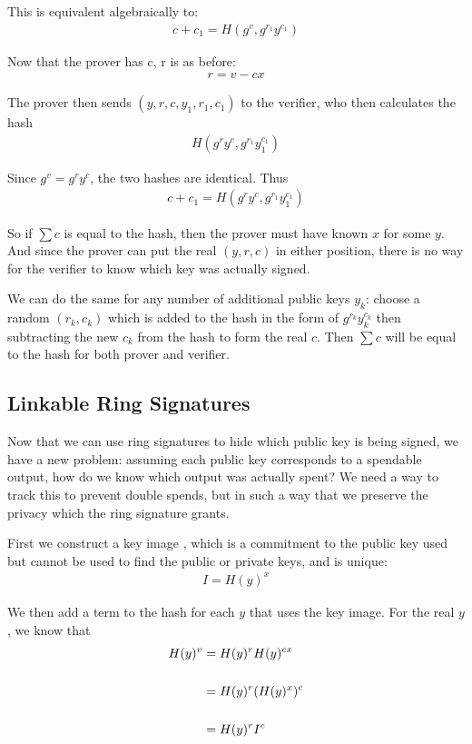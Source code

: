 \documentclass{article}
\begin{document}
This is equivalent algebraically to:
\begin{align}
  c + c_1 = H(g^v, g^{r_1} y^{c_1})\nonumber
\end{align}

Now that the prover has c, r is as before:
\begin{align}
  r = v - cx
\end{align}

The prover then sends $(y, r, c, y_1, r_1, c_1)$ to the verifier, who then calculates the hash
\begin{align}
  H(g^r y^c, g^{r_1} y_1^{c_1})\nonumber
\end{align}

Since $g^v = g^r y^c$, the two hashes are identical.  Thus 
\begin{align}
  c + c_1 = H(g^r y^c, g^{r_1} y_1^{c_1})
\end{align}

So if $\sum c$ is equal to the hash, then the prover must have known $x$ for some $y$.  And since the prover can put the real $(y,r,c)$ in either position, there is no way for the verifier to know which key was actually signed.

We can do the same for any number of additional public keys $y_k$: choose a random $(r_k,c_k)$ which is added to the hash in the form of $g^{r_k}y_k^{c_k}$ then subtracting the new $c_k$ from the hash to form the real $c$. Then $\sum c$ will be equal to the hash for both prover and verifier.



\subsection{Linkable Ring Signatures}

Now that we can use ring signatures to hide which public key is being signed, we have a new problem: assuming each public key corresponds to a spendable output, how do we know which output was actually spent?  We need a way to track this to prevent double spends, but in such a way that we preserve the privacy which the ring signature grants.

First we construct a key image \cite{cryptonote}, which is a commitment to the public key used but cannot be used to find the public or private keys, and is unique:
\begin{align}
  I = H(y)^x
\end{align}

We then add a term to the hash for each $y$ that uses the key image.  For the real $y$, we know that
\begin{align}
  H(y)^v &= H(y)^r H(y)^{cx}\nonumber\\
  \cr &= H(y)^r (H(y)^x)^c\nonumber\\
  \cr &= H(y)^r I^c
\end{align}
\end{document}
